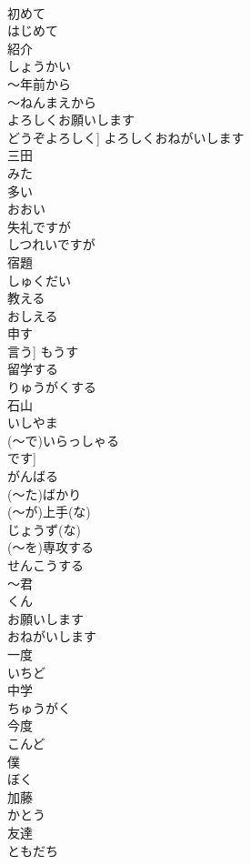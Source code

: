 \documentclass[8pt]{extreport}
\begin{document}
\begin{CJK}{UTF8}{min}
\\	初めて	
\\	はじめて
\\	紹介	
\\	しょうかい
\\	～年前から	
\\	～ねんまえから
\\	よろしくお願いします	
\\	どうぞよろしく]	よろしくおねがいします
\\	三田	
\\	みた
\\	多い	
\\	おおい
\\	失礼ですが	
\\	しつれいですが
\\	宿題	
\\	しゅくだい
\\	教える	
\\	おしえる
\\	申す	
\\	言う]	もうす
\\	留学する	
\\	りゅうがくする
\\	石山	
\\	いしやま
\\	(～で)いらっしゃる	
\\	です]	
\\	がんばる	
\\	(～た)ばかり	
\\	(～が)上手(な)	
\\	じょうず(な)
\\	(～を)専攻する	
\\	せんこうする
\\	～君	
\\	くん
\\	お願いします	
\\	おねがいします
\\	一度	
\\	いちど
\\	中学	
\\	ちゅうがく
\\	今度	
\\	こんど
\\	僕	
\\	ぼく
\\	加藤	
\\	かとう
\\	友達	
\\	ともだち

\end{CJK}
\end{document}
